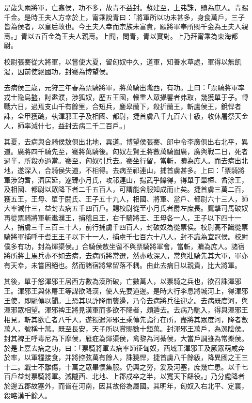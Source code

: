 \begin{pinyinscope}
是歲失兩將軍，亡翕侯，功不多，故青不益封。蘇建至，上弗誅，贖為庶人。青賜千金。是時王夫人方幸於上，甯乘說青曰：「將軍所以功未甚多，身食萬戶，三子皆為侯者，以皇后故也。今王夫人幸而宗族未富貴，願將軍奉所賜千金為王夫人親壽。」青以五百金為王夫人親壽。上聞，問青，青以實對。上乃拜甯乘為東海都尉。

校尉張騫從大將軍，以嘗使大夏，留匈奴中久，道軍，知善水草處，軍得以無飢渴，因前使絕國功，封騫為博望侯。

去病侯三歲，元狩三年春為票騎將軍，將萬騎出隴西，有功。上曰：「票騎將軍率戎士隃烏盭，討遫濮，涉狐奴，歷五王國，輜重人眾攝讋者弗取，幾獲單于子。轉戰六日，過焉支山千有餘里，合短兵，鏖皋蘭下，殺折蘭王，斬盧侯王，銳悍者誅，全甲獲醜，執渾邪王子及相國、都尉，捷首虜八千九百六十級，收休屠祭天金人，師率減什七，益封去病二千二百戶。」

其夏，去病與合騎侯敖俱出北地，異道。博望侯張騫、郎中令李廣俱出右北平，異道。廣將四千騎先至，騫將萬騎後。匈奴左賢王將數萬騎圍廣，廣與戰二日，死者過半，所殺亦過當。騫至，匈奴引兵去。騫坐行留，當斬，贖為庶人。而去病出北地，遂深入，合騎侯失道，不相得。去病至祁連山，捕首虜甚多。上曰：「票騎將軍涉鈞耆，濟居延，遂臻小月氏，攻祁連山，揚武乎鱳得，得單于單桓、酋涂王，及相國、都尉以眾降下者二千五百人，可謂能舍服知成而止矣。捷首虜三萬二百，獲五王，王母、單于閼氏、王子五十九人，相國、將軍、當戶、都尉六十三人，師大率減什三，益封去病五千四百戶。賜校尉從至小月氏者爵左庶長。鷹擊司馬破奴再從票騎將軍斬遫濮王，捕稽且王，右千騎將王、王母各一人，王子以下四十一人，捕虜三千三百三十人，前行捕虜千四百人，封破奴為從票侯。校尉高不識從票騎將軍捕呼于耆王王子以下十一人，捕虜千七百六十八人，封不識為宜冠侯。校尉僕多有功，封為煇渠侯。」合騎侯敖坐留不與票騎將軍會，當斬，贖為庶人。諸宿將所將士馬兵亦不如去病，去病所將常選，然亦敢深入，常與壯騎先其大軍，軍亦有天幸，未嘗困絕也。然而諸宿將常留落不耦。由此去病日以親貴，比大將軍。

其後，單于怒渾邪王居西方數為漢所破，亡數萬人，以票騎之兵也，欲召誅渾邪王。渾邪王與休屠王等謀欲降漢，使人先要道邊。是時大行李息將城河上，得渾邪王使，即馳傳以聞。上恐其以詐降而襲邊，乃令去病將兵往迎之。去病既度河，與渾邪眾相望。渾邪裨王將見漢軍而多欲不降者，頗遁去。去病乃馳入，得與渾邪王相見，斬其欲亡者八千人，遂獨遣渾邪王乘傳先詣行在所，盡將其眾度河，降者數萬人，號稱十萬。既至長安，天子所以賞賜數十鉅萬。封渾邪王萬戶，為漯陰侯。封其裨王呼毒尼為下摩侯，雁疪為煇渠侯，禽黎為河綦侯，大當戶調雖為常樂侯。於是上嘉去病之功，曰：「票騎將軍去病率師征匈奴，西域王渾邪王及厥眾萌咸奔於率，以軍糧接食，并將控弦萬有餘人，誅獟悍，捷首虜八千餘級，降異國之王三十二。戰士不離傷，十萬之眾畢懷集服。仍興之勞，爰及河塞，庶幾亡患。以千七百戶益封票騎將軍。減隴西、北地、上郡戍卒之半，以寬天下繇役。」乃分處降者於邊五郡故塞外，而皆在河南，因其故俗為屬國。其明年，匈奴入右北平、定襄，殺略漢千餘人。


\end{pinyinscope}
